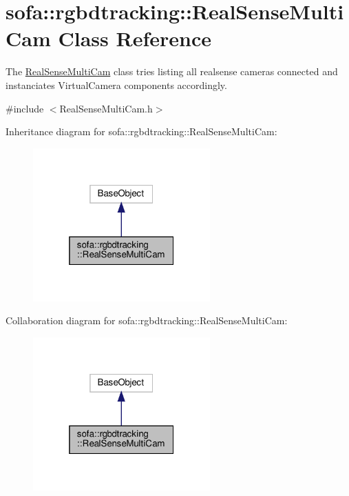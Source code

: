 \hypertarget{classsofa_1_1rgbdtracking_1_1_real_sense_multi_cam}{}\section{sofa\+:\+:rgbdtracking\+:\+:Real\+Sense\+Multi\+Cam Class Reference}
\label{classsofa_1_1rgbdtracking_1_1_real_sense_multi_cam}


The \hyperlink{classsofa_1_1rgbdtracking_1_1_real_sense_multi_cam}{Real\+Sense\+Multi\+Cam} class tries listing all realsense cameras connected and instanciates Virtual\+Camera components accordingly.  




{\ttfamily \#include $<$Real\+Sense\+Multi\+Cam.\+h$>$}



Inheritance diagram for sofa\+:\+:rgbdtracking\+:\+:Real\+Sense\+Multi\+Cam\+:\nopagebreak
\begin{figure}[H]
\begin{center}
\leavevmode
\includegraphics[width=193pt]{classsofa_1_1rgbdtracking_1_1_real_sense_multi_cam__inherit__graph}
\end{center}
\end{figure}


Collaboration diagram for sofa\+:\+:rgbdtracking\+:\+:Real\+Sense\+Multi\+Cam\+:\nopagebreak
\begin{figure}[H]
\begin{center}
\leavevmode
\includegraphics[width=193pt]{classsofa_1_1rgbdtracking_1_1_real_sense_multi_cam__coll__graph}
\end{center}
\end{figure}
